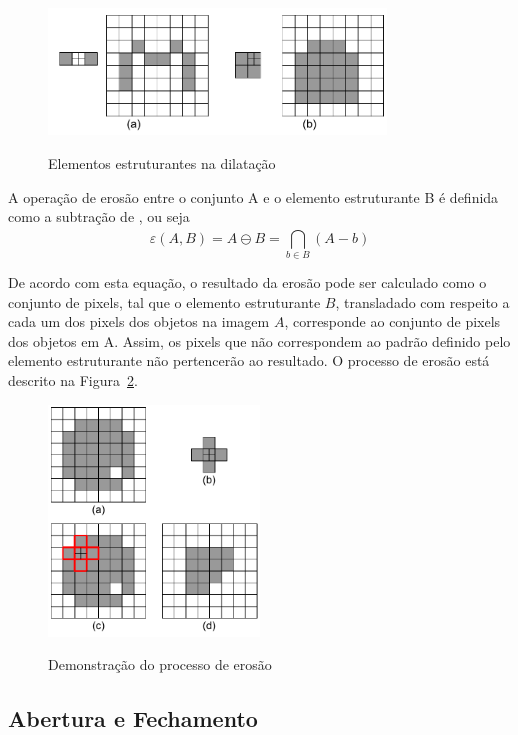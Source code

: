 \documentclass[12pt,oneside,a4paper,english,french,spanish,brazil,]{abntex2}
\begin{document}
\begin{figure}[ht]
\centering
\caption{Elementos estruturantes na dilatação}
\includegraphics[width=0.8\textwidth]{imagens/PDI_Dilatacao_2.pdf}
\sourceAuthor
\label{fig:PDI_Dilatacao_2}
\end{figure}

A operação de erosão entre o conjunto A e o elemento estruturante B é definida como a subtração de \citet{minkowski:1911}, ou seja \[\varepsilon(A,B)=A\ominus B=\bigcap_{b\in B}^{ } (A-b)\]

De acordo com esta equação, o resultado da erosão pode ser calculado como o conjunto de pixels, tal que o elemento estruturante \(B\), transladado com respeito a cada um dos pixels dos objetos na imagem \(A\), corresponde ao conjunto de pixels dos objetos em A. Assim, os pixels que não correspondem ao padrão definido pelo elemento estruturante não pertencerão ao resultado. O processo de erosão está descrito na Figura~\ref{fig:PDI_Erosao_1}.

\begin{figure}[ht]
\centering
\caption{Demonstração do processo de erosão}
\includegraphics[width=0.5\textwidth]{imagens/PDI_Erosao_1.pdf}
\sourceAuthor
\label{fig:PDI_Erosao_1}
\end{figure}

\subsection{Abertura e Fechamento}
\end{document}
